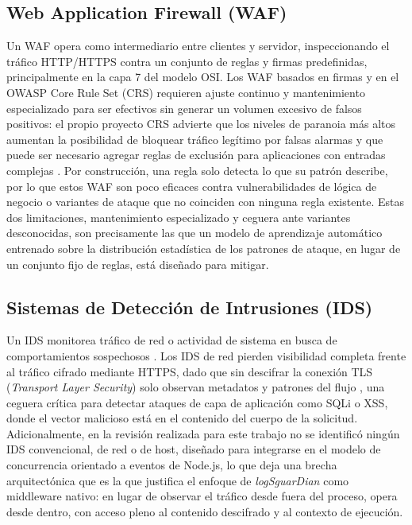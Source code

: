 \subsection{Web Application Firewall (WAF)}
Un WAF opera como intermediario entre clientes y servidor, inspeccionando el tráfico HTTP/HTTPS
contra un conjunto de reglas y firmas predefinidas, principalmente en la capa 7 del modelo OSI.
Los WAF basados en firmas y en el OWASP Core Rule Set (CRS) requieren ajuste continuo y mantenimiento especializado para ser efectivos sin generar un volumen
excesivo de falsos positivos: el propio proyecto CRS advierte que los niveles de paranoia más altos
aumentan la posibilidad de bloquear tráfico legítimo por falsas alarmas y que puede ser necesario
agregar reglas de exclusión para aplicaciones con entradas complejas \cite{crs2026paranoia}. Por
construcción, una regla solo detecta lo que su patrón describe, por lo que estos WAF son poco
eficaces contra vulnerabilidades de lógica de negocio o variantes de ataque que no coinciden con
ninguna regla existente. Estas
dos limitaciones, mantenimiento especializado y ceguera ante variantes desconocidas, son
precisamente las que un modelo de aprendizaje automático entrenado sobre la distribución
estadística de los patrones de ataque, en lugar de un conjunto fijo de reglas, está diseñado para
mitigar.

\subsection{Sistemas de Detección de Intrusiones (IDS)}
Un IDS monitorea tráfico de red o actividad de sistema en busca de comportamientos sospechosos
\cite{nist80094}. Los IDS de red pierden visibilidad completa frente al tráfico cifrado mediante
HTTPS, dado que sin descifrar la conexión TLS (\textit{Transport Layer Security}) solo observan metadatos y patrones del flujo
\cite{papadogiannaki2021survey}, una ceguera crítica para detectar ataques de capa de aplicación como SQLi o XSS, donde el vector
malicioso está en el contenido del cuerpo de la solicitud. Adicionalmente, en la revisión realizada para este trabajo no se identificó ningún IDS convencional,
de red o de host, diseñado para integrarse en el modelo de concurrencia orientado a eventos de
Node.js, lo que deja una brecha arquitectónica que es la que justifica el enfoque de
\textit{logSguarDian} como middleware nativo: en lugar de observar el tráfico desde fuera del
proceso, opera desde dentro, con acceso pleno al contenido descifrado y al contexto de ejecución.

